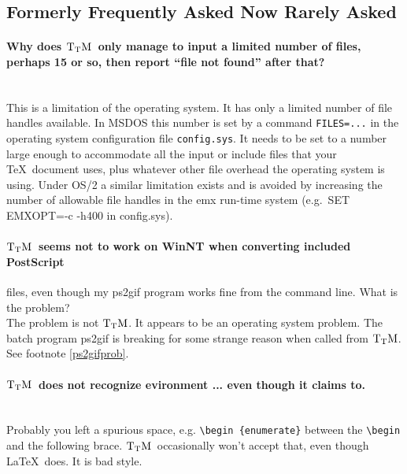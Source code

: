 \documentclass[12pt]{article}
\def\TtM{$\rm{}T_TH$}
\def\TtM{$\rm{}T_TM$}%
\begin{document}
\subsection{Formerly Frequently Asked Now Rarely Asked}

\paragraph{Why does \TtM\ only manage to input a limited number
of files, perhaps 15 or so, then report ``file not found'' after
that?}\leavevmode\\
This is a limitation of the operating system. It has only a limited
number of file handles available. In MSDOS this number is set by a command 
\verb!FILES=...! in the operating system configuration file
\verb|config.sys|. It needs to be set to a number large enough to
accommodate all the input or include files that your \TeX\ document
uses, plus whatever other file overhead the operating system is
using. Under OS/2 a similar limitation exists and is avoided by 
increasing the number of allowable file handles in the emx run-time
system (e.g.~SET EMXOPT=-c -h400 in config.sys). 

\paragraph{\TtM\ seems not to work on WinNT when converting
included PostScript} files, even though my ps2gif program works fine
from the command line. What is the problem?\leavevmode\\
The problem is not \TtM. It appears to be an operating system
problem. The batch program ps2gif is breaking for some strange reason
when called from \TtM. See footnote \ref{ps2gifprob}.

\paragraph{\TtM\ does not recognize evironment ... even though it
claims to.}\leavevmode\\
Probably you left a spurious space, e.g. \verb+\begin {enumerate}+
between the \verb+\begin+ and the following brace. \TtM\ occasionally won't
accept that, even though \LaTeX\ does. It is bad style.

\printindex
\end{document}

